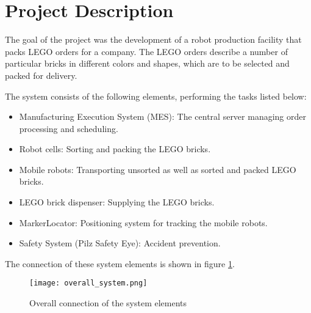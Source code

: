 \chapter*{Project Description}\label{chap:project_description}


The goal of the project was the development of a robot production facility that packs LEGO orders for a company. The LEGO orders describe a number of particular bricks in different colors and shapes, which are to be selected and packed for delivery. 

The system consists of the following elements, performing the tasks listed below:
\begin{itemize}
	\item Manufacturing Execution System (MES): The central server managing order processing and scheduling. 
	\item Robot cells: Sorting and packing the LEGO bricks. 
	\item Mobile robots: Transporting unsorted as well as sorted and packed LEGO bricks. 
	\item LEGO brick dispenser: Supplying the LEGO bricks. 
	\item MarkerLocator: Positioning system for tracking the mobile robots. 
	\item Safety System (Pilz Safety Eye): Accident prevention.
\end{itemize}

The connection of these system elements is shown in figure \ref{fig:overall_system_diagram}.
    \begin{figure}[H]
        \centering
        \texttt{[image: overall\_system.png]}
        \caption{Overall connection of the system elements}
        \label{fig:overall_system_diagram}
    \end{figure}

